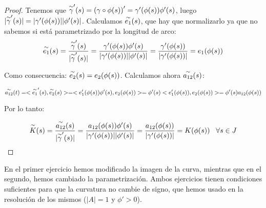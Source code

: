 \documentclass[12pt]{article}
\begin{document}
\begin{proof}

Tenemos que $\overset{\sim}{ \gamma }'(s)=\left(\gamma\circ\phi(s)\right)'=\gamma'(\phi(s))\phi'(s)$, luego $|\overset{\sim}{ \gamma }'(s)|=|\gamma'(\phi(s))||\phi'(s)|$. Calculamos $\overset{\sim}{ e_1 }(s)$, que hay que normalizarlo ya que no sabemos si está parametrizado por la longitud de arco: 
\[
\overset{\sim}{ e_1 }(s)=\frac{\overset{\sim}{ \gamma }'(s)}{|\overset{\sim}{ \gamma }'(s)|}=\frac{\gamma'(\phi(s))\phi'(s)}{|\gamma'(\phi(s))||\phi'(s)|}=\frac{\gamma'(\phi(s))}{|\gamma'(\phi(s))|}=e_1(\phi(s))
\]

Como consecuencia: $\overset{\sim}{ e_2 }(s)=e_2(\phi(s))$. Calculamos ahora $\overset{\sim}{ a_{12} }(s)$:

\[
\overset{\sim}{ a_{12} }(t)=<\overset{\sim}{ e_1 }'(s),\overset{\sim}{ e_2 }(s)>=<e_1'(\phi(s))\phi'(s),e_2(\phi(s))>=\phi'(s)<e_1'(\phi(s)),e_2(\phi(s))>=\phi'(s)a_{12}(\phi(s))
\]

Por lo tanto:

\[
\overset{\sim}{ K }(s)=\frac{\overset{\sim}{ a_{12} }(s)}{|\overset{\sim}{ \gamma }'(s)|}=\frac{a_{12}(\phi(s))\phi'(s)}{|\gamma'(\phi(s))||\phi'(s)|}=\frac{a_{12}(\phi(s))}{|\gamma'(\phi(s))|}=K(\phi(s)) \;\;\; \forall s\in J
\]

\end{proof}

\begin{remark}
En el primer ejercicio hemos modificado la imagen de la curva, mientras que en el segundo, hemos cambiado la parametrización. Ambos ejercicios tienen condiciones suficientes para que la curvatura no cambie de signo, que hemos usado en la resolución de los mismos ($|A|=1$ y $\phi'>0$).
\end{remark}
\end{document}

